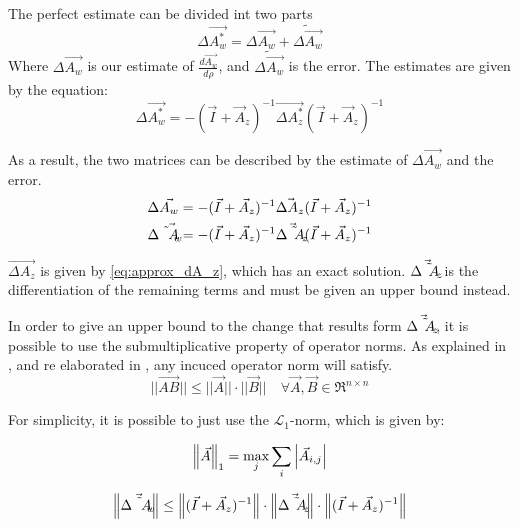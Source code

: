 The perfect estimate can be divided int two parts 
\begin{equation}
 \Delta\Vec{A_w^*} = \Delta\Vec{A_w} + \tilde{\Delta\Vec{A_w}}
\end{equation}
Where $\Delta\Vec{A_w}$ is our estimate of $\frac{d \Vec{A_w}}{d\rho}$, and $\tilde{\Delta\Vec{A_w}}$ is the error. 
The estimates are given by the equation: 
\begin{equation}
 \Delta\Vec{A_w^*} = - ( \Vec{I}+\Vec{A}_z)^{-1} \Vec{\Delta A_z^{*}} ( \Vec{I}+\Vec{A}_z)^{-1}
\end{equation}{}

As a result, the two matrices can be described by the estimate of $\Delta\Vec{A_w}$ and the error. 
\begin{align}
 \Delta\Vec{A_w} = - ( \Vec{I}+\Vec{A}_z)^{-1} \Vec{\Delta A_z}( \Vec{I}+\Vec{A}_z)^{-1}\\
 \Delta\Vec{\Tilde{A}_w} = - ( \Vec{I}+\Vec{A}_z)^{-1} \Vec{\Delta \Tilde{A}_z}( \Vec{I}+\Vec{A}_z)^{-1}
\end{align}{}

$\Vec{\Delta A_z}$ is given by \cref{eq:approx_dA_z}, which has an exact solution. $\Vec{\Delta \Tilde{A}_z}$ is the differentiation of the remaining terms and must be given an upper bound instead. 


In order to give an upper bound to the change that results form $\Vec{\Delta \Tilde{A}_z}$, it is possible to use the submultiplicative property of operator norms. As explained in \cite{Triangle_inequality_source}, and re elaborated in , any incuced operator norm will satisfy.
\begin{equation}
 ||\Vec{AB}|| \leq ||\Vec{A}|| \cdot ||\Vec{B}|| \quad \forall \Vec{A}, \Vec{B} \in \Re^{n \times n}
 \label{eq:submultiplicativity}
\end{equation}

For simplicity, it is possible to just use the $\mathcal{L}_1$-norm, which is given by: 

\begin{equation}
 \left\lVert\Vec{A}\right\rVert_1 = \max_j \sum_{i}\left|\Vec{A}_{i,j}\right|
\end{equation}

\begin{equation}
 \left\lVert \Vec{ \Delta \Tilde{A}_w} \right\rVert \leq \left\lVert( \Vec{I}+\Vec{A}_z)^{-1}\right\rVert \cdot \left\lVert\Vec{\Delta \Tilde{A}_z}\right\rVert \cdot \left\lVert( \Vec{I}+\Vec{A}_z)^{-1}\right\rVert
\end{equation}{}

